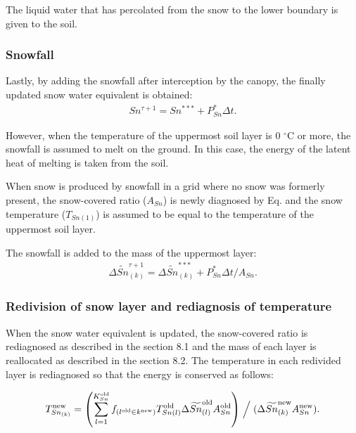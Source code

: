The liquid water that has percolated from the snow to the lower boundary is given to the soil.

\subsubsection{Snowfall}\label{snowfall}

Lastly, by adding the snowfall after interception by the canopy, the finally updated snow water equivalent is obtained: \begin{eqnarray}
Sn^{\tau+1} = Sn^{\ast\ast\ast} + P_{Sn}^{\ast} \Delta t. \label{8-26}
\end{eqnarray}

However, when the temperature of the uppermost soil layer is 0 \(^\circ\mathrm{C}\) or more, the snowfall is assumed to melt on the ground. In this case, the energy of the latent heat of melting is
taken from the soil.

When snow is produced by snowfall in a grid where no snow was formerly present, the snow-covered ratio (\(A_{Sn}\)) is newly diagnosed by Eq. \hyperref[8-5]{} and the snow temperature (\(T_{Sn(1)}\))
is assumed to be equal to the temperature of the uppermost soil layer.

The snowfall is added to the mass of the uppermost layer: \begin{eqnarray}
\Delta\widetilde{Sn}_{(k)}^{\tau+1} = \Delta\widetilde{Sn}_{(k)}^{\ast\ast\ast} + P_{Sn}^{\ast} \Delta t /A_{Sn}. \label{8-27}
\end{eqnarray}

\subsubsection{Redivision of snow layer and rediagnosis of temperature}\label{redivision-of-snow-layer-and-rediagnosis-of-temperature}

When the snow water equivalent is updated, the snow-covered ratio is rediagnosed as described in the section 8.1 and the mass of each layer is reallocated as described in the section 8.2. The
temperature in each redivided layer is rediagnosed so that the energy is conserved as follows:

\begin{eqnarray}
T_{Sn_{(k)}}^{\mathrm{new}} = \left(
 \sum_{l=1}^{K_{Sn}^{\mathrm{old}}}
 f_{(l^{\mathrm{old}}\in k^{\mathrm{new}})} T_{Sn(l)}^{\mathrm{old}}
 \Delta\widetilde{Sn}_{(l)}^{\mathrm{old}} A_{Sn}^{\mathrm{old}}
\right) \Bigm/ (\Delta\widetilde{Sn}_{(k)}^{\mathrm{new}} A_{Sn}^{\mathrm{new}}). \label{8-28}
\end{eqnarray}

